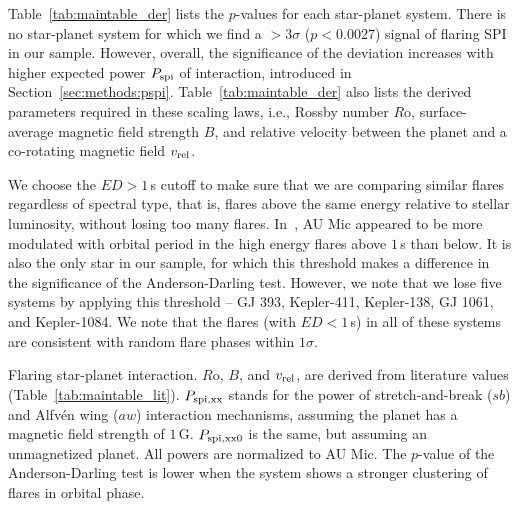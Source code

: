 \documentclass[twocolumn]{aastex631}
\begin{document}
Table~\ref{tab:maintable_der} lists the $p$-values for each star-planet system. There is no star-planet system for which we find a $>3\sigma$ ($p<0.0027$) signal of flaring SPI in our sample. However, overall, the significance of the deviation increases with higher expected power $P_{\rm spi}$ of interaction, introduced in Section~\ref{sec:methods:pspi}. Table~\ref{tab:maintable_der} also lists the derived parameters required in these scaling laws, i.e., Rossby number $R$o, surface-average magnetic field strength $B$, and relative velocity between the planet and a co-rotating magnetic field $v_{\rm rel}$. 

We choose the $ED>1\,$s cutoff to make sure that we are comparing similar flares regardless of spectral type, that is, flares above the same energy relative to stellar luminosity, without losing too many flares. In~\citet{ilin2022searching}, AU Mic appeared to be more modulated with orbital period in the high energy flares above $1\,$s than below. It is also the only star in our sample, for which this threshold makes a difference in the significance of the Anderson-Darling test. However, we note that we lose five systems by applying this threshold -- GJ 393, Kepler-411, Kepler-138, GJ 1061, and Kepler-1084. We note that the flares (with $ED<1\,$s) in all of these systems are consistent with random flare phases within $1\sigma$.




\begin{table*}
\footnotesize
\movetableright=-20mm
\caption{Flaring star-planet interaction. $R$o, $B$, and $v_{\rm rel}$, are derived from literature values (Table~\ref{tab:maintable_lit}). $P_{\rm spi,xx}$ stands for the power of stretch-and-break ($sb$) and Alfv\'en wing ($aw$) interaction mechanisms, assuming the planet has a magnetic field strength of $1\,$G. $P_{\rm spi,xx0}$ is the same, but assuming an unmagnetized planet. All powers are normalized to AU Mic. The $p$-value of the Anderson-Darling test is lower when the system shows a stronger clustering of flares in orbital phase.}

    \label{tab:maintable_der}

\end{table*}
\end{document}
